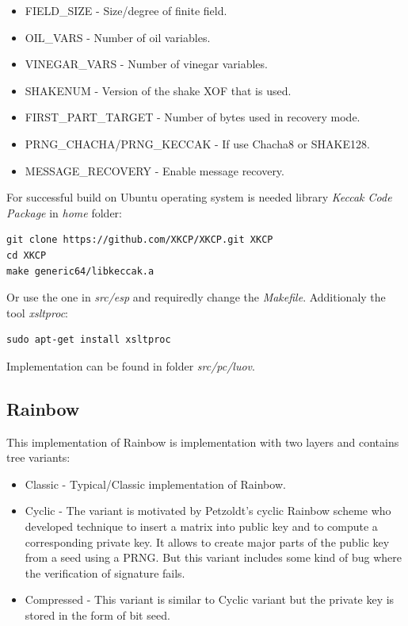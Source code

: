\documentclass[thesis=M,english]{FITthesis}[2019/12/23]
\begin{document}
\begin{itemize}
\item	FIELD\_SIZE - Size/degree of finite field.
\item	OIL\_VARS - Number of oil variables.
\item	VINEGAR\_VARS - Number of vinegar variables.
\item	SHAKENUM - Version of the shake XOF that is used.
\item	FIRST\_PART\_TARGET - Number of bytes used in recovery mode.
\item	PRNG\_CHACHA/PRNG\_KECCAK - If use Chacha8 or SHAKE128. 
\item	MESSAGE\_RECOVERY - Enable message recovery.
\end{itemize}

For successful build on Ubuntu operating system is needed library \textit{Keccak Code Package} in \textit{home} folder:
\begin{lstlisting}[frame=single]
git clone https://github.com/XKCP/XKCP.git XKCP
cd XKCP
make generic64/libkeccak.a
\end{lstlisting}
Or use the one in \textit{src/esp} and requiredly change the \textit{Makefile}. Additionaly the tool \textit{xsltproc}:
\begin{lstlisting}[frame=single]
sudo apt-get install xsltproc
\end{lstlisting}

\bigskip
\noindent
Implementation can be found in folder \textit{src/pc/luov}. 

\subsection{Rainbow}
This implementation of Rainbow is implementation with two layers and contains tree variants:
\begin{itemize}
\item	Classic - Typical/Classic implementation of Rainbow.
\item	Cyclic - The variant is motivated by Petzoldt's cyclic Rainbow scheme\cite{L-RB-CYC} who developed technique to insert a matrix into public key and to compute a corresponding private key. It allows to create major parts of the public key from a seed using a PRNG. But this variant includes some kind of bug where the verification of signature fails.
\item	Compressed - This variant is similar to Cyclic variant but the private key is stored in the form of bit seed.  
\end{itemize}
\end{document}
